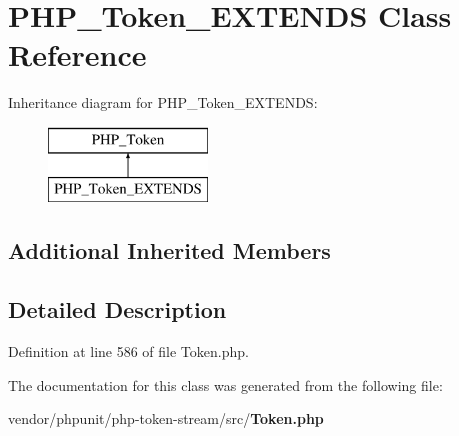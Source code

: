 \section{P\+H\+P\+\_\+\+Token\+\_\+\+E\+X\+T\+E\+N\+D\+S Class Reference}
\label{class_p_h_p___token___e_x_t_e_n_d_s}
Inheritance diagram for P\+H\+P\+\_\+\+Token\+\_\+\+E\+X\+T\+E\+N\+D\+S\+:\begin{figure}[H]
\begin{center}
\leavevmode
\includegraphics[height=2.000000cm]{class_p_h_p___token___e_x_t_e_n_d_s}
\end{center}
\end{figure}
\subsection*{Additional Inherited Members}


\subsection{Detailed Description}


Definition at line 586 of file Token.\+php.



The documentation for this class was generated from the following file\+:\begin{DoxyCompactItemize}
\item 
vendor/phpunit/php-\/token-\/stream/src/{\bf Token.\+php}\end{DoxyCompactItemize}

